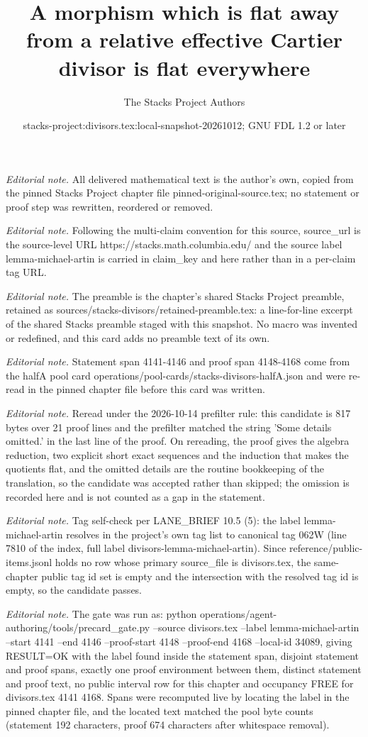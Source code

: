 \documentclass[10pt,a4paper]{amsart}
\title{A morphism which is flat away from a relative effective Cartier divisor is flat everywhere}
\author{The Stacks Project Authors}
\date{stacks-project:divisors.tex:local-snapshot-20261012; GNU FDL 1.2 or later}
\theoremstyle{plain}
\theoremstyle{definition}
\theoremstyle{remark}
\numberwithin{equation}{subsection}
\begin{document}
\maketitle
\noindent\textit{Editorial note.} All delivered mathematical text is the author's own, copied from the pinned Stacks Project chapter file pinned-original-source.tex; no statement or proof step was rewritten, reordered or removed.\par\medskip
\noindent\textit{Editorial note.} Following the multi-claim convention for this source, source\_url is the source-level URL https://stacks.math.columbia.edu/ and the source label lemma-michael-artin is carried in claim\_key and here rather than in a per-claim tag URL.\par\medskip
\noindent\textit{Editorial note.} The preamble is the chapter's shared Stacks Project preamble, retained as sources/stacks-divisors/retained-preamble.tex: a line-for-line excerpt of the shared Stacks preamble staged with this snapshot. No macro was invented or redefined, and this card adds no preamble text of its own.\par\medskip
\noindent\textit{Editorial note.} Statement span 4141-4146 and proof span 4148-4168 come from the halfA pool card operations/pool-cards/stacks-divisors-halfA.json and were re-read in the pinned chapter file before this card was written.\par\medskip
\noindent\textit{Editorial note.} Reread under the 2026-10-14 prefilter rule: this candidate is 817 bytes over 21 proof lines and the prefilter matched the string 'Some details omitted.' in the last line of the proof. On rereading, the proof gives the algebra reduction, two explicit short exact sequences and the induction that makes the quotients flat, and the omitted details are the routine bookkeeping of the translation, so the candidate was accepted rather than skipped; the omission is recorded here and is not counted as a gap in the statement.\par\medskip
\noindent\textit{Editorial note.} Tag self-check per LANE\_BRIEF 10.5 (5): the label lemma-michael-artin resolves in the project's own tag list to canonical tag 062W (line 7810 of the index, full label divisors-lemma-michael-artin). Since reference/public-items.jsonl holds no row whose primary source\_file is divisors.tex, the same-chapter public tag id set is empty and the intersection with the resolved tag id is empty, so the candidate passes.\par\medskip
\noindent\textit{Editorial note.} The gate was run as: python operations/agent-authoring/tools/precard\_gate.py --source divisors.tex --label lemma-michael-artin --start 4141 --end 4146 --proof-start 4148 --proof-end 4168 --local-id 34089, giving RESULT=OK with the label found inside the statement span, disjoint statement and proof spans, exactly one proof environment between them, distinct statement and proof text, no public interval row for this chapter and occupancy FREE for divisors.tex 4141 4168. Spans were recomputed live by locating the label in the pinned chapter file, and the located text matched the pool byte counts (statement 192 characters, proof 674 characters after whitespace removal).\par\medskip
\end{document}
